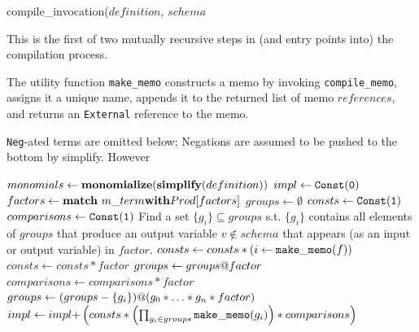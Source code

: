 \documentclass[11pt]{amsart}
\begin{document}
\begin{algorithm}
\caption{compile\_invocation($definition$, $schema$}

This is the first of two mutually recursive steps in (and entry points into) the compilation process.  

The utility function {\tt make\_memo} constructs a memo by invoking {\tt compile\_memo}, assigns it a unique name, appends it to the returned list of memo $references$, and returns an {\tt External} reference to the memo.  

{\tt Neg}-ated terms are omitted below; Negations are assumed to be pushed to the bottom by simplify.  However

\begin{algorithmic}
\STATE $monomials \gets {\bf monomialize}({\bf simplify}(definition))$
\STATE $impl \gets {\tt Const(0)}$
  \STATE $factors \gets {\bf match}\ m\_term {\bf with} Prod[factors]$
  \STATE $groups \gets \emptyset$
  \STATE $consts \gets {\tt Const(1)}$
  \STATE $comparisons \gets {\tt Const(1)}$
    \STATE Find a set $\{g_i\} \subseteq groups$ s.t. $\{g_i\}$ contains all elements of $groups$ that produce an output variable $v \not \in schema$ that appears (as an input or output variable) in $factor$.
        \STATE $consts \gets consts * (i \gets {\tt make\_memo}(f))$
        \STATE $consts \gets consts * factor$
      \ELSE
        \STATE $groups \gets groups {\bf @} factor$
      \ENDIF
    \ELSE
        \STATE $comparisons \gets comparisons * factor$
      \ELSE
        \STATE $groups \gets (groups - \{g_i\}) {\bf @} (g_0 * \ldots * g_n * factor)$
      \ENDIF
    \ENDIF
  \ENDFOR
  \STATE $impl \gets impl {\bf +} \left(consts * \left(\prod_{g_i \in groups} {\tt make\_memo}(g_i)\right) * comparisons\right)$
\ENDFOR
\end{algorithmic}
\end{algorithm}
\end{document}
